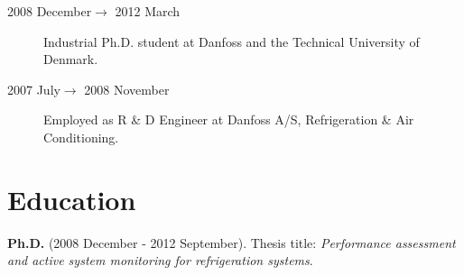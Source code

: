 \documentclass[margin,line,a4paper]{resume}
\begin{document}
\begin{resume}
\begin{description}
    \item[2008 December$\rightarrow$ 2012 March] Industrial Ph.D. student at Danfoss and the Technical University of Denmark. %

    \item[2007 July$\rightarrow$ 2008 November] Employed as R \& D Engineer at Danfoss A/S, Refrigeration \& Air Conditioning. %

\end{description} 

\section{\mysidestyle Education} 

    \textbf{Ph.D.} (2008 December - 2012 September). Thesis title: \textit{Performance assessment and active system monitoring for refrigeration systems}. 


\end{resume}
\end{document}
